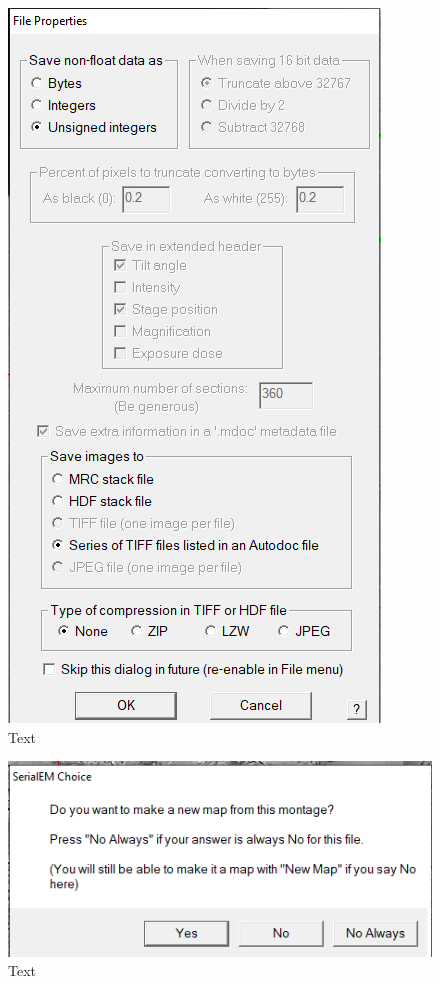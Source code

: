 \documentclass[12pt, a4paper]{scrartcl}
\begin{document}
\begin{figure}[H]
\includegraphics[scale=1]{screenshots/SetupPolygonMontage3.png}
\caption{Text}
\end{figure}


\begin{figure}[H]
\includegraphics[scale=1]{screenshots/AddAsMap.png}
\caption{Text}
\end{figure}
\end{document}
